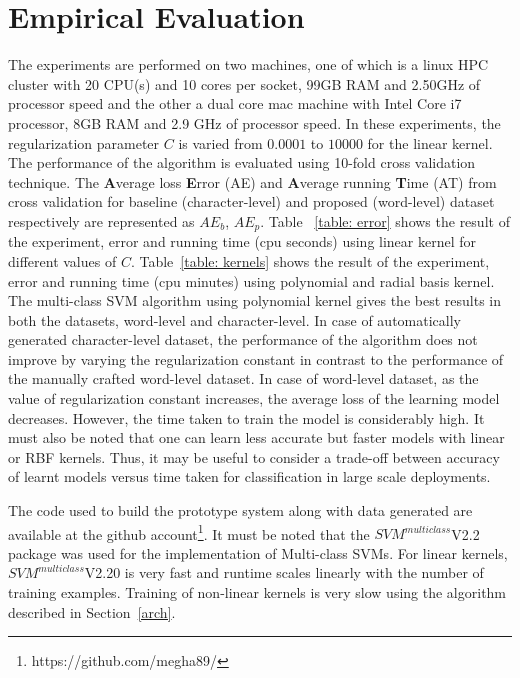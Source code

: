\documentclass{sig-alternate}
\begin{document}
\section{Empirical Evaluation}
\label{sec:evaluation}

The experiments are performed on two machines, one of which is a linux HPC cluster with 20 CPU(s) and 10 cores per socket, 99GB RAM and 2.50GHz of processor speed and the other a dual core mac machine with Intel Core i7 processor, 8GB RAM and 2.9 GHz of processor speed. In these experiments, the regularization parameter $C$ is varied from $0.0001$ to $10000$ for the linear kernel. The performance of the algorithm is evaluated using 10-fold cross validation technique. The \textbf{A}verage loss \textbf{E}rror (AE) and  \textbf{A}verage running \textbf{T}ime (AT) from cross validation for baseline (character-level) and proposed (word-level) dataset respectively are represented as $AE_{b}$, $AE_{p}$. Table ~\ref{table: error} shows the result of the experiment, error and running time (cpu seconds) using linear kernel for different values of $C$. Table~\ref{table: kernels} shows the result of the experiment, error and running time (cpu minutes) using polynomial and radial basis kernel.\\
The multi-class SVM algorithm using polynomial kernel gives the best results in both the datasets, word-level and character-level. In case of automatically generated character-level dataset, the performance of the algorithm does not improve by varying the regularization constant in contrast to the performance of the manually crafted word-level dataset. In case of word-level dataset, as the value of regularization constant increases, the average loss of the learning model decreases. However, the time taken to train the model is considerably high. It must also be noted that one can learn less accurate but faster models with linear or RBF kernels. Thus, it may be useful to consider a trade-off between accuracy of learnt models versus time taken for classification in large scale deployments.
 
The code used to build the prototype system along with data generated are available at the github account\footnote{https://github.com/megha89/}. It must be noted that the $SVM^{multiclass}$V2.2 package \cite{algo} was used for the implementation of Multi-class SVMs. 
For linear kernels, $SVM^{multiclass}$V2.20 is very fast and runtime scales linearly with the number of training examples. Training of non-linear kernels is very slow using the algorithm described in Section~\ref{arch}.
\end{document}
